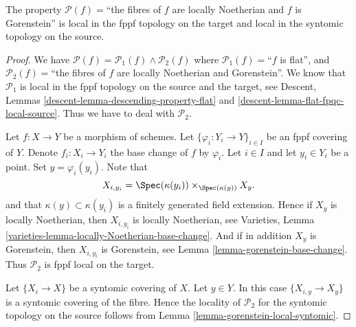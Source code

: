 \begin{lemma}
\label{lemma-gorenstein-local-source-and-target}
The property
$\mathcal{P}(f)=$``the fibres of $f$ are locally Noetherian and $f$ is
Gorenstein'' is local in the fppf topology on the target and
local in the syntomic topology on the source.
\end{lemma}

\begin{proof}
We have
$\mathcal{P}(f) =
\mathcal{P}_1(f) \wedge \mathcal{P}_2(f)$
where
$\mathcal{P}_1(f)=$``$f$ is flat'', and
$\mathcal{P}_2(f)=$``the fibres of $f$ are locally Noetherian
and Gorenstein''.
We know that $\mathcal{P}_1$ is
local in the fppf topology on the source and the target, see
Descent, Lemmas \ref{descent-lemma-descending-property-flat} and
\ref{descent-lemma-flat-fpqc-local-source}. Thus we have to deal
with $\mathcal{P}_2$.

\medskip\noindent
Let $f : X \to Y$ be a morphism of schemes.
Let $\{\varphi_i : Y_i \to Y\}_{i \in I}$ be an fppf covering of $Y$.
Denote $f_i : X_i \to Y_i$ the base change of $f$ by $\varphi_i$.
Let $i \in I$ and let $y_i \in Y_i$ be a point.
Set $y = \varphi_i(y_i)$. Note that
$$
X_{i, y_i} = \Spec(\kappa(y_i)) \times_{\Spec(\kappa(y))} X_y.
$$
and that $\kappa(y) \subset \kappa(y_i)$ is a finitely generated field
extension. Hence if $X_y$ is locally Noetherian, then
$X_{i, y_i}$ is locally Noetherian, see
Varieties, Lemma \ref{varieties-lemma-locally-Noetherian-base-change}.
And if in addition $X_y$ is Gorenstein,
then $X_{i, y_i}$ is Gorenstein, see
Lemma \ref{lemma-gorenstein-base-change}.
Thus $\mathcal{P}_2$ is fppf local on the target.

\medskip\noindent
Let $\{X_i \to X\}$ be a syntomic covering of $X$.
Let $y \in Y$. In this case $\{X_{i, y} \to X_y\}$ is a
syntomic covering of the fibre. Hence the locality of $\mathcal{P}_2$
for the syntomic topology on the source follows from
Lemma \ref{lemma-gorenstein-local-syntomic}.
\end{proof}














